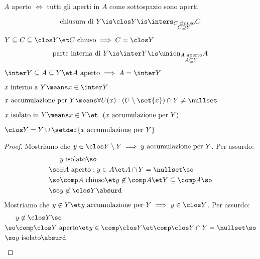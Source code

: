 
\begin{prop}
$A$ aperto $\iff$ tutti gli aperti in $A$ come sottospazio sono aperti
\end{prop}


\begin{defn}
\[\text{chiusura di }Y\is\clos Y\is\inters_{\substack{C\text{ chiuso}\\C\supseteq Y}}C\]
\end{defn}

\begin{prop}
$Y\subseteq C\subseteq\clos Y\et C\text{ chiuso}\implies C=\clos Y$
\end{prop}

\begin{defn}
\[\text{parte interna di }Y\is\inter Y\is\union_{\substack{A\text{ aperto}\\A\subseteq Y}}A\]
\end{defn}

\begin{prop}
$\inter Y\subseteq A\subseteq Y\et A\text{ aperto}\implies A=\inter Y$
\end{prop}

\begin{defn}
$x\text{ interno a }Y\means x\in\inter Y$
\end{defn}

\begin{defn}
$x\text{ accumulazione per }Y\means\forall U(x):(U\setminus\set{x})\cap Y\neq\nullset$
\end{defn}

\begin{defn}
$x\text{ isolato in }Y\means x\in Y\et\neg(x\text{ accumulazione per }Y)$
\end{defn}

\begin{lemma}
$\clos Y=Y\cup\setdef{x\text{ accumulazione per }Y}$
\end{lemma}
\begin{proof}
Mostriamo che $y\in\clos Y\setminus Y\implies y\text{ accumulazione per }Y$. Per assurdo:
\begin{align*}
&y\text{ isolato}\so\\
\so&\exists A\text{ aperto}:y\in A\et A\cap Y=\nullset\so\\
\so&\comp A\text{ chiuso}\et y\not\in\comp A\et Y\subseteq\comp A\so\\
\so&y\not\in\clos Y\absurd
\end{align*}
Mostriamo che $y\not\in Y\et y\text{ accumulazione per }Y\implies y\in\clos Y$. Per assurdo:
\begin{align*}
&y\not\in\clos Y\so\\
\so&\comp\clos Y\text{ aperto}\et y\in\comp\clos Y\et\comp\clos Y\cap Y=\nullset\so\\
\so&y\text{ isolato}\absurd \qedhere
\end{align*}
\end{proof}

